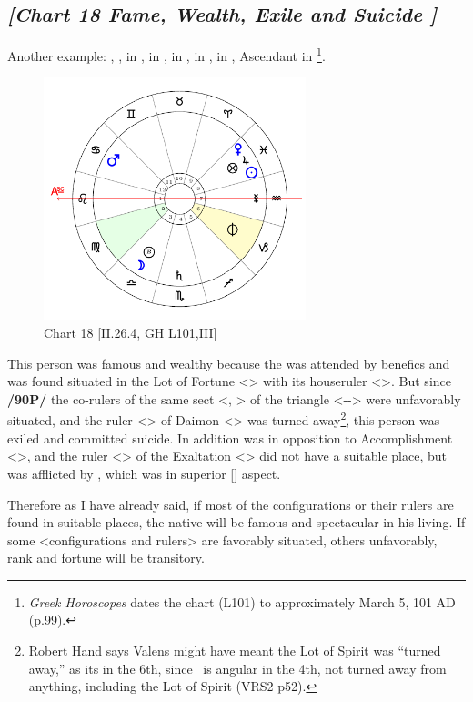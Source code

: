 \newpage
\subsection*{\textit{[Chart 18 Fame, Wealth, Exile and Suicide ]}}

Another example: \Sun, \Jupiter, \Venus\xspace in \Pisces, \Moon\xspace in \Libra, \Mars\xspace in \Cancer, \Mercury\xspace in \Aquarius, \Saturn\xspace in \Scorpio, Ascendant in \Leo
\footnote{\textit{Greek Horoscopes} dates the chart (L101) to approximately March 5, 101 AD (p.99).}.

\clearpage
\begin{figure}
\centering

\includegraphics[width=0.68\textwidth]{charts/2_26_4}
\caption{Chart 18 [II.26.4, GH L101,III]}
\label{fig:chart18}
\end{figure}


This person was famous and wealthy because the \Sun\xspace was attended by benefics and was found situated in the Lot of Fortune <\Pisces> with its houseruler <\Jupiter>. But since \textbf{/90P/} the co-rulers of the same sect <\Mars, \Moon> of the triangle <\Pisces-\Cancer-\Scorpio> were
unfavorably situated, and the ruler <\Saturn> of Daimon <\Capricorn> was turned away\footnote{Robert Hand says Valens might have meant the Lot of Spirit was ``turned away,'' as its in the 6th, since \Saturn\, is angular in the 4th, not turned away from anything, including the Lot of Spirit (VRS2 p52).}, this person was exiled and committed suicide. In addition \Mars\xspace was in opposition to Accomplishment <\Capricorn>, and the ruler <\Mercury> of the Exaltation <\Virgo> did not have a suitable place, but was afflicted by \Saturn, which was in superior [\Square] aspect.

Therefore \mndl as I have already said, if most of the configurations or their rulers are found in suitable places,
the native will be famous and spectacular in his living. If some <configurations and rulers> are favorably
situated, others unfavorably, rank and fortune will be transitory.

\newpage